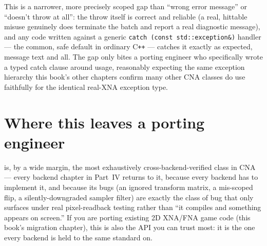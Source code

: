 This is a narrower, more precisely scoped gap than ``wrong error message'' or ``doesn't throw at
all'': the throw itself is correct and reliable (a real, hittable misuse genuinely does
terminate the batch and report a real diagnostic message), and any code written against a
generic \texttt{catch (const std::exception\&)} handler --- the common, safe default in
ordinary C\texttt{++} --- catches it exactly as expected, message text and all. The gap only
bites a porting engineer who specifically wrote a typed 
catch clause around  usage, reasonably expecting the same exception
hierarchy this book's other chapters confirm many other CNA classes do use faithfully for the
identical real-XNA exception type.

\section{Where this leaves a porting engineer}

 is, by a wide margin, the most exhaustively cross-backend-verified
class in CNA --- every backend chapter in Part~IV returns to it, because every backend has
to implement it, and because its bugs (an ignored transform matrix, a mis-scoped flip, a
silently-downgraded sampler filter) are exactly the class of bug that only surfaces under
real pixel-readback testing rather than ``it compiles and something appears on screen.'' If
you are porting existing 2D XNA/FNA game code (this book's migration chapter), this is also
the API you can trust most: it is the one every backend is held to the same standard on.
